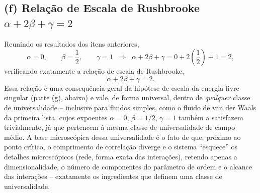 \documentclass[11pt,a4paper]{article}
\begin{document}
\subsection*{(f) Relação de Escala de Rushbrooke $\alpha+2\beta+\gamma=2$}
%
Reunindo os resultados dos itens anteriores,
%
\begin{equation}
    \alpha=0,\qquad \beta=\frac12,\qquad\gamma=1
    \;\;\Longrightarrow\;\;
    \alpha+2\beta+\gamma=0+2\left(\frac12\right)+1=2,
\end{equation}
%
verificando exatamente a relação de escala de Rushbrooke,
%
\begin{equation}
    \boxed{\alpha+2\beta+\gamma=2.}
\end{equation}
%
Essa relação é uma consequência geral da hipótese de escala da energia livre singular (parte (g), abaixo) e vale, de forma universal, dentro de \emph{qualquer} classe de universalidade -- inclusive para fluidos simples, como o fluido de van der Waals da primeira lista, cujos expoentes $\alpha=0$, $\beta=1/2$, $\gamma=1$ também a satisfazem trivialmente, já que pertencem à mesma classe de universalidade de campo médio. A base microscópica dessa universalidade é o fato de que, próximo ao ponto crítico, o comprimento de correlação diverge e o sistema ``esquece'' os detalhes microscópicos (rede, forma exata das interações), retendo apenas a dimensionalidade, o número de componentes do parâmetro de ordem e o alcance das interações -- exatamente os ingredientes que definem uma classe de universalidade.
%
\end{document}
